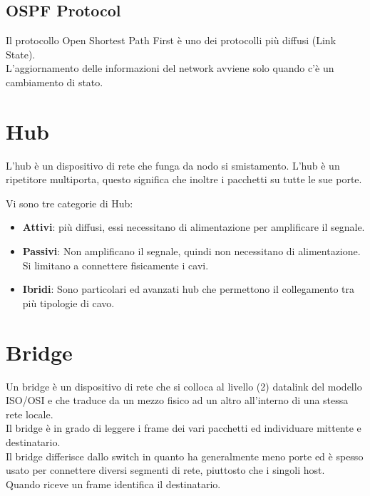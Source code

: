 \documentclass[a4paper]{article}
\begin{document}
\subsection{OSPF Protocol}

Il protocollo Open Shortest Path First è uno dei protocolli più diffusi (Link State).
\\
L'aggiornamento delle informazioni del network avviene solo quando c'è un cambiamento di stato.


\section{Hub}

L'hub è un dispositivo di rete che funga da nodo si smistamento.
L'hub è un ripetitore multiporta, questo significa che inoltre i pacchetti su tutte le sue porte.

Vi sono tre categorie di Hub:

\begin{itemize}
    \item \textbf{Attivi}: più diffusi, essi necessitano di alimentazione per amplificare il segnale.

    \item \textbf{Passivi}: Non amplificano il segnale, quindi non
        necessitano di alimentazione. Si limitano a connettere fisicamente i cavi.

    \item \textbf{Ibridi}: Sono particolari ed avanzati hub che permettono il collegamento tra più
        tipologie di cavo.
\end{itemize}

\section{Bridge}

Un bridge è un dispositivo di rete che si colloca al livello (2) datalink del modello ISO/OSI e che
traduce da un mezzo fisico ad un altro all'interno di una stessa rete locale.
\\
Il bridge è in grado di leggere i frame dei vari pacchetti ed individuare mittente e destinatario.
\\
Il bridge differisce dallo switch in quanto ha generalmente meno porte ed è spesso usato per
connettere diversi segmenti di rete, piuttosto che i singoli host.
\\
Quando riceve un frame identifica il destinatario.
\end{document}
